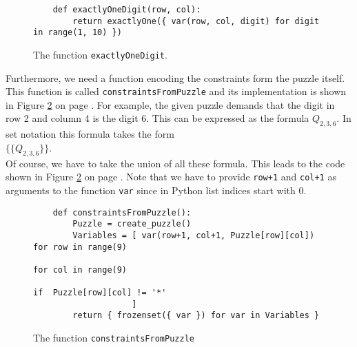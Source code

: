 \begin{figure}[!ht]
\centering
\begin{verbatim}
    def exactlyOneDigit(row, col):
        return exactlyOne({ var(row, col, digit) for digit in range(1, 10) })
\end{verbatim}
\vspace*{-0.3cm}
\caption{The function \texttt{exactlyOneDigit}.}
\label{fig:sudoku-exactlyOneDigit}
\end{figure}

Furthermore, we need a function encoding the constraints form the puzzle itself.
This function is called \texttt{constraintsFromPuzzle} and its implementation is shown in Figure
\ref{fig:sudoku-constraintsFromPuzzle} on page \pageref{fig:sudoku-constraintsFromPuzzle}.
For example, the given puzzle demands that the digit in row 2 and column 4 is the digit $6$.
This can be expressed as the formula $Q_{2,3,6}$.  In set notation this formula takes the form
\\[0.2cm]
\hspace*{1.3cm}
$\bigl\{ \{Q_{2,3,6}\} \bigr\}$.
\\[0.2cm]
Of course, we have to take the union of all these formula.  This leads to the code shown in Figure
\ref{fig:sudoku-constraintsFromPuzzle} on page \pageref{fig:sudoku-constraintsFromPuzzle}.
Note that we have to provide \texttt{row+1} and \texttt{col+1} as arguments to the function \texttt{var} since
in Python list indices start with $0$.

\begin{figure}[!ht]
\centering
\begin{verbatim}
    def constraintsFromPuzzle():
        Puzzle = create_puzzle()
        Variables = [ var(row+1, col+1, Puzzle[row][col]) for row in range(9)
                                                          for col in range(9)
                                                          if  Puzzle[row][col] != '*'
                    ]
        return { frozenset({ var }) for var in Variables }                 
\end{verbatim}
\vspace*{-0.3cm}
\caption{The function \texttt{constraintsFromPuzzle}}
\label{fig:sudoku-constraintsFromPuzzle}
\end{figure}

